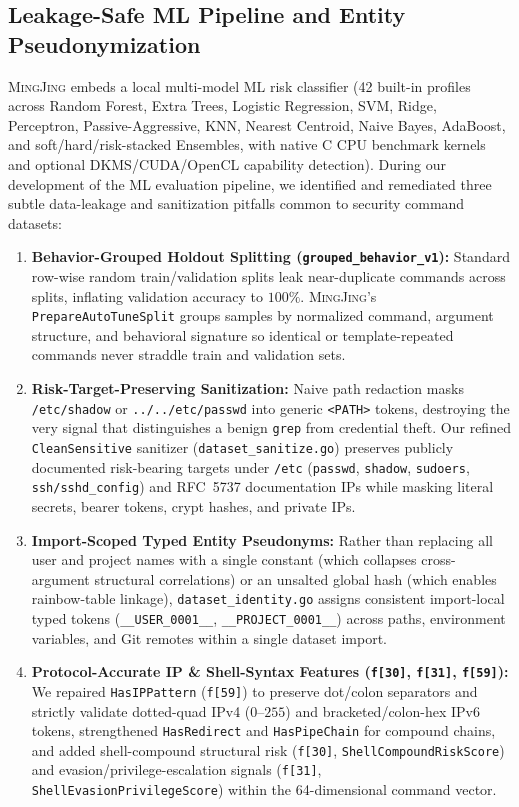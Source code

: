 \documentclass[10pt,twocolumn,letterpaper]{article}
\newcommand{\sys}{\textsc{MingJing}}
\newcommand{\code}[1]{\texttt{\small #1}}
\begin{document}
\subsection{Leakage-Safe ML Pipeline and Entity Pseudonymization}
\sys{} embeds a local multi-model ML risk classifier (42 built-in profiles across Random Forest, Extra Trees, Logistic Regression, SVM, Ridge, Perceptron, Passive-Aggressive, KNN, Nearest Centroid, Naive Bayes, AdaBoost, and soft/hard/risk-stacked Ensembles, with native C CPU benchmark kernels and optional DKMS/CUDA/OpenCL capability detection). During our development of the ML evaluation pipeline, we identified and remediated three subtle data-leakage and sanitization pitfalls common to security command datasets:
\begin{enumerate}
  \item \textbf{Behavior-Grouped Holdout Splitting (\code{grouped\_behavior\_v1}):} Standard row-wise random train/validation splits leak near-duplicate commands across splits, inflating validation accuracy to $100\%$. \sys{}'s \code{PrepareAutoTuneSplit} groups samples by normalized command, argument structure, and behavioral signature so identical or template-repeated commands never straddle train and validation sets.
  \item \textbf{Risk-Target-Preserving Sanitization:} Naive path redaction masks \code{/etc/shadow} or \code{../../etc/passwd} into generic \code{<PATH>} tokens, destroying the very signal that distinguishes a benign \code{grep} from credential theft. Our refined \code{CleanSensitive} sanitizer (\code{dataset\_sanitize.go}) preserves publicly documented risk-bearing targets under \code{/etc} (\code{passwd}, \code{shadow}, \code{sudoers}, \code{ssh/sshd\_config}) and RFC~5737 documentation IPs while masking literal secrets, bearer tokens, crypt hashes, and private IPs.
  \item \textbf{Import-Scoped Typed Entity Pseudonyms:} Rather than replacing all user and project names with a single constant (which collapses cross-argument structural correlations) or an unsalted global hash (which enables rainbow-table linkage), \code{dataset\_identity.go} assigns consistent import-local typed tokens (\code{\_\_USER\_0001\_\_}, \code{\_\_PROJECT\_0001\_\_}) across paths, environment variables, and Git remotes within a single dataset import.
  \item \textbf{Protocol-Accurate IP \& Shell-Syntax Features (\code{f[30]}, \code{f[31]}, \code{f[59]}):} We repaired \code{HasIPPattern} (\code{f[59]}) to preserve dot/colon separators and strictly validate dotted-quad IPv4 ($0\text{--}255$) and bracketed/colon-hex IPv6 tokens, strengthened \code{HasRedirect} and \code{HasPipeChain} for compound chains, and added shell-compound structural risk (\code{f[30]}, \code{ShellCompoundRiskScore}) and evasion/privilege-escalation signals (\code{f[31]}, \code{ShellEvasionPrivilegeScore}) within the 64-dimensional command vector.
\end{enumerate}
\end{document}

